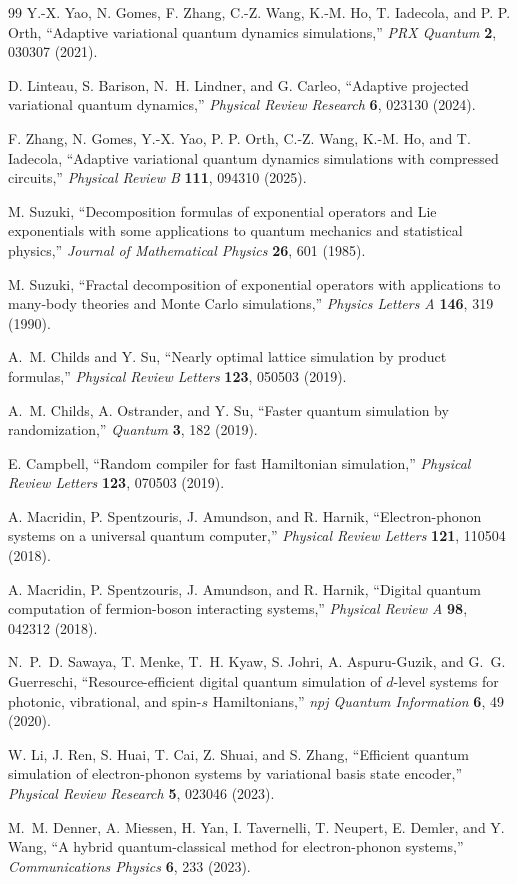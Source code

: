 \documentclass[
  reprint,
  amsmath,
  amssymb,
  aps,
  pra,
  nofootinbib,
  superscriptaddress,
  floatfix
]{revtex4-2}
\begin{document}
\begin{thebibliography}{99}
Y.-X. Yao, N. Gomes, F. Zhang, C.-Z. Wang, K.-M. Ho, T. Iadecola, and P. P. Orth,
``Adaptive variational quantum dynamics simulations,''
\emph{PRX Quantum} \textbf{2}, 030307 (2021).

D. Linteau, S. Barison, N.~H. Lindner, and G. Carleo,
``Adaptive projected variational quantum dynamics,''
\emph{Physical Review Research} \textbf{6}, 023130 (2024).

F. Zhang, N. Gomes, Y.-X. Yao, P. P. Orth, C.-Z. Wang, K.-M. Ho, and T. Iadecola,
``Adaptive variational quantum dynamics simulations with compressed circuits,''
\emph{Physical Review B} \textbf{111}, 094310 (2025).

M. Suzuki,
``Decomposition formulas of exponential operators and Lie exponentials with some applications to quantum mechanics and statistical physics,''
\emph{Journal of Mathematical Physics} \textbf{26}, 601 (1985).

M. Suzuki,
``Fractal decomposition of exponential operators with applications to many-body theories and Monte Carlo simulations,''
\emph{Physics Letters A} \textbf{146}, 319 (1990).

A.~M. Childs and Y. Su,
``Nearly optimal lattice simulation by product formulas,''
\emph{Physical Review Letters} \textbf{123}, 050503 (2019).

A.~M. Childs, A. Ostrander, and Y. Su,
``Faster quantum simulation by randomization,''
\emph{Quantum} \textbf{3}, 182 (2019).

E. Campbell,
``Random compiler for fast Hamiltonian simulation,''
\emph{Physical Review Letters} \textbf{123}, 070503 (2019).

A. Macridin, P. Spentzouris, J. Amundson, and R. Harnik,
``Electron-phonon systems on a universal quantum computer,''
\emph{Physical Review Letters} \textbf{121}, 110504 (2018).

A. Macridin, P. Spentzouris, J. Amundson, and R. Harnik,
``Digital quantum computation of fermion-boson interacting systems,''
\emph{Physical Review A} \textbf{98}, 042312 (2018).

N.~P.~D. Sawaya, T. Menke, T.~H. Kyaw, S. Johri, A. Aspuru-Guzik, and G.~G. Guerreschi,
``Resource-efficient digital quantum simulation of $d$-level systems for photonic, vibrational, and spin-$s$ Hamiltonians,''
\emph{npj Quantum Information} \textbf{6}, 49 (2020).

W. Li, J. Ren, S. Huai, T. Cai, Z. Shuai, and S. Zhang,
``Efficient quantum simulation of electron-phonon systems by variational basis state encoder,''
\emph{Physical Review Research} \textbf{5}, 023046 (2023).

M.~M. Denner, A. Miessen, H. Yan, I. Tavernelli, T. Neupert, E. Demler, and Y. Wang,
``A hybrid quantum-classical method for electron-phonon systems,''
\emph{Communications Physics} \textbf{6}, 233 (2023).

\end{thebibliography}
\end{document}
